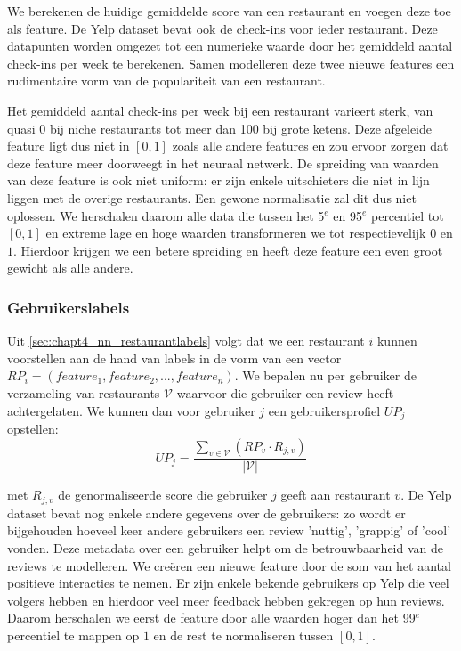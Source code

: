 We berekenen de huidige gemiddelde score van een restaurant en voegen deze toe als feature. De Yelp dataset bevat ook de check-ins voor ieder restaurant. Deze datapunten worden omgezet tot een numerieke waarde door het gemiddeld aantal check-ins per week te berekenen. Samen modelleren deze twee nieuwe features een rudimentaire vorm van de populariteit van een restaurant.

Het gemiddeld aantal check-ins per week bij een restaurant varieert sterk, van quasi 0 bij niche restaurants tot meer dan 100 bij grote ketens. Deze afgeleide feature ligt dus niet in $[0, 1]$ zoals alle andere features en zou ervoor zorgen dat deze feature meer doorweegt in het neuraal netwerk. De spreiding van waarden van deze feature is ook niet uniform: er zijn enkele uitschieters die niet in lijn liggen met de overige restaurants. Een gewone normalisatie zal dit dus niet oplossen. We herschalen daarom alle data die tussen het 5$^e$ en 95$^e$ percentiel tot $[0, 1]$ en extreme lage en hoge waarden transformeren we tot respectievelijk $0$ en $1$. Hierdoor krijgen we een betere spreiding en heeft deze feature een even groot gewicht als alle andere.

\subsubsection{Gebruikerslabels}
Uit \autoref{sec:chapt4_nn_restaurantlabels} volgt dat we een restaurant $i$ kunnen voorstellen aan de hand van labels in de vorm van een vector $RP_i = (feature_1, feature_2, ..., feature_n)$. We bepalen nu per gebruiker de verzameling van restaurants $\mathcal{V}$ waarvoor die gebruiker een review heeft achtergelaten. We kunnen dan voor gebruiker $j$ een gebruikersprofiel $UP_j$ opstellen:
\begin{equation}
    UP_j = \frac{\sum_{v \in \mathcal{V}} (RP_v \cdot R_{j, v})}{\vert \mathcal{V} \vert}
\end{equation}

met $R_{j, v}$ de genormaliseerde score die gebruiker $j$ geeft aan restaurant $v$. De Yelp dataset bevat nog enkele andere gegevens over de gebruikers: zo wordt er bijgehouden hoeveel keer andere gebruikers een review 'nuttig', 'grappig' of 'cool' vonden. Deze metadata over een gebruiker helpt om de betrouwbaarheid van de reviews te modelleren. We creëren een nieuwe feature door de som van het aantal positieve interacties te nemen. Er zijn enkele bekende gebruikers op Yelp die veel volgers hebben en hierdoor veel meer feedback hebben gekregen op hun reviews. Daarom herschalen we eerst de feature door alle waarden hoger dan het 99$^e$ percentiel te mappen op $1$ en de rest te normaliseren tussen $[0, 1]$.

